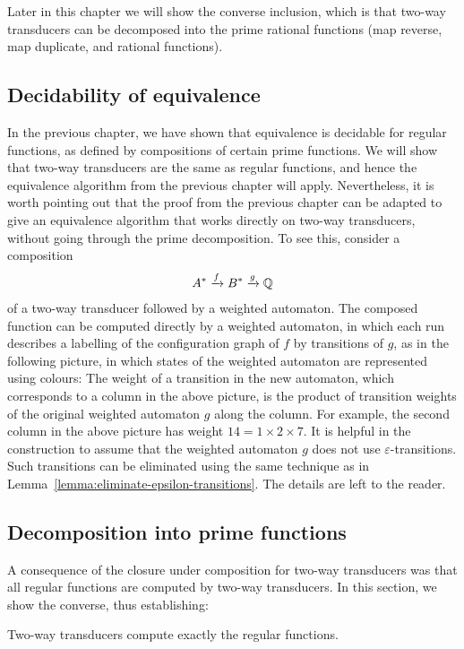 Later in this chapter we will show the converse inclusion, which is that two-way transducers can be decomposed into the prime rational functions (map reverse, map duplicate, and rational functions).

\subsection{Decidability of equivalence}
\label{sec:decidability-equivalence-2dfa}

In the previous chapter, we have shown that equivalence is decidable for regular functions, as defined by compositions of certain prime functions. We will show that two-way transducers are the same as regular functions, and hence the equivalence algorithm from the previous chapter will apply. Nevertheless, it is worth pointing out that the proof from the previous chapter can be adapted to give an equivalence algorithm that works directly on two-way transducers, without going through the prime decomposition. To see this, consider a composition 
\begin{align*}
A^* \xrightarrow f B^* \xrightarrow g {\mathbb Q}
\end{align*}
of a two-way transducer followed by a weighted automaton. The composed function can be computed directly by a weighted automaton, in which each run describes a labelling of the configuration graph of $f$ by transitions of $g$, as in the following picture, in which states of the weighted automaton are represented using colours:
The weight of a transition in the new automaton, which corresponds to a column in the above picture, is the product of transition weights of the original weighted automaton $g$ along the column. For example, the second column in the above picture has weight $14 = 1 \times 2 \times 7$. It is helpful in the construction to assume that the weighted automaton $g$ does not use $\varepsilon$-transitions. Such transitions can be eliminated using the same technique as in Lemma~\ref{lemma:eliminate-epsilon-transitions}. The details are left to the reader. 


\subsection{Decomposition into prime functions}
\label{sec:decomposition-2dfa-into-primes}

A consequence of the closure under composition for two-way transducers was that all regular functions are computed by two-way transducers. In this section, we show the converse, thus establishing:
\begin{theorem}
    \label{thm:2dfa-decomposition-into-primes}
    Two-way transducers compute exactly the regular functions. 
\end{theorem}

